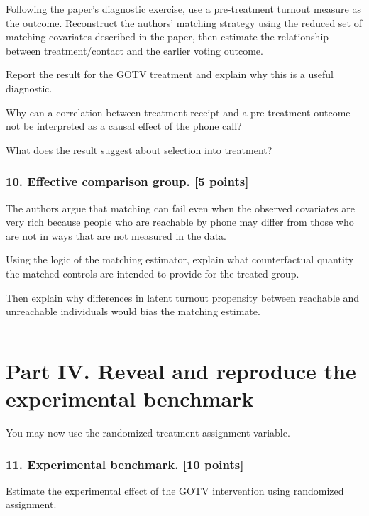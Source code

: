 \documentclass[
]{article}
\begin{document}
Following the paper's diagnostic exercise, use a pre-treatment turnout
measure as the outcome. Reconstruct the authors' matching strategy using
the reduced set of matching covariates described in the paper, then
estimate the relationship between treatment/contact and the earlier
voting outcome.

Report the result for the GOTV treatment and explain why this is a
useful diagnostic.

Why can a correlation between treatment receipt and a pre-treatment
outcome not be interpreted as a causal effect of the phone call?

What does the result suggest about selection into treatment?

\subsubsection{10. Effective comparison group. {[}5
points{]}}\label{effective-comparison-group.-5-points}

The authors argue that matching can fail even when the observed
covariates are very rich because people who are reachable by phone may
differ from those who are not in ways that are not measured in the data.

Using the logic of the matching estimator, explain what counterfactual
quantity the matched controls are intended to provide for the treated
group.

Then explain why differences in latent turnout propensity between
reachable and unreachable individuals would bias the matching estimate.

\begin{center}\rule{0.5\linewidth}{0.5pt}\end{center}

\section{Part IV. Reveal and reproduce the experimental
benchmark}\label{part-iv.-reveal-and-reproduce-the-experimental-benchmark}

You may now use the randomized treatment-assignment variable.

\subsubsection{11. Experimental benchmark. {[}10
points{]}}\label{experimental-benchmark.-10-points}

Estimate the experimental effect of the GOTV intervention using
randomized assignment.
\end{document}
